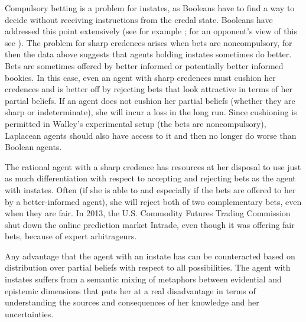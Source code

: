 \documentclass[11pt]{article}
\begin{document}
Compulsory betting is a problem for instates, as Booleans have to find
a way to decide without receiving instructions from the credal state.
Booleans have addressed this point extensively (see for example
; for an opponent's view of this see
). The problem for sharp credences arises when
bets are noncompulsory, for then the data above suggests that agents
holding instates sometimes do better. Bets are sometimes offered by
better informed or potentially better informed bookies. In this case,
even an agent with sharp credences must cushion her credences and is
better off by rejecting bets that look attractive in terms of her
partial beliefs. If an agent does not cushion her partial beliefs
(whether they are sharp or indeterminate), she will incur a loss in
the long run. Since cushioning is permitted in Walley's experimental
setup (the bets are noncompulsory), Laplacean agents should also have
access to it and then no longer do worse than Boolean agents.

The rational agent with a sharp credence has resources at her disposal
to use just as much differentiation with respect to accepting and
rejecting bets as the agent with instates. Often (if she is able to
and especially if the bets are offered to her by a better-informed
agent), she will reject both of two complementary bets, even when they
are fair. In 2013, the U.S. Commodity Futures Trading Commission shut
down the online prediction market Intrade, even though it was offering
fair bets, because of expert arbitrageurs.

Any advantage that the agent with an instate has can be counteracted
based on distribution over partial beliefs with respect to all
possibilities. The agent with instates suffers from a semantic mixing
of metaphors between evidential and epistemic dimensions that puts her
at a real disadvantage in terms of understanding the sources and
consequences of her knowledge and her uncertainties.




%  

% 
\end{document}
